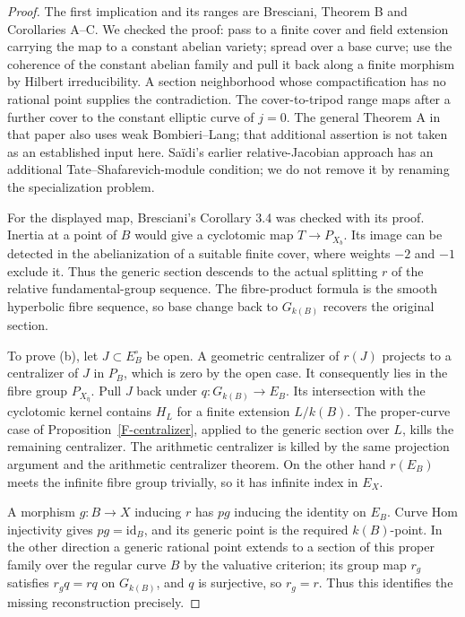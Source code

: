 \begin{proof}
The first implication and its ranges are Bresciani, Theorem B
and Corollaries A--C\cite{F-BrescianiFiniteType}. We checked
the proof: pass to a finite cover and field extension carrying
the map to a constant abelian variety; spread over a base
curve; use the coherence of the constant abelian family and
pull it back along a finite morphism by Hilbert irreducibility.
A section neighborhood whose compactification has no rational
point supplies the contradiction. The cover-to-tripod range
maps after a further cover to the constant elliptic curve of
$j=0$. The general Theorem A in that paper also uses weak
Bombieri--Lang; that additional assertion is not taken as an
established input here. Sa\"idi's earlier relative-Jacobian
approach has an additional Tate--Shafarevich-module condition;
we do not remove it by renaming the specialization problem.

For the displayed map, Bresciani's Corollary 3.4 was checked
with its proof. Inertia at a point of $B$ would give a
cyclotomic map $T\to P_{X_b}$. Its image can be detected in
the abelianization of a suitable finite cover, where weights
$-2$ and $-1$ exclude it. Thus the generic section descends
to the actual splitting $r$ of the relative fundamental-group
sequence. The fibre-product formula is the smooth hyperbolic
fibre sequence, so base change back to $G_{k(B)}$ recovers the
original section.

To prove (b), let $J\subset E_B^\circ$ be open. A geometric
centralizer of $r(J)$ projects to a centralizer of $J$ in
$P_B$, which is zero by the open case. It consequently lies
in the fibre group $P_{X_{\overline\eta}}$. Pull $J$ back
under $q:G_{k(B)}\to E_B$. Its intersection with the
cyclotomic kernel contains $H_L$ for a finite extension
$L/k(B)$. The proper-curve case of
Proposition~\ref{F-centralizer}, applied to the generic
section over $L$, kills the remaining centralizer. The
arithmetic centralizer is killed by the same projection
argument and the arithmetic centralizer theorem. On the
other hand $r(E_B)$ meets the infinite fibre group trivially,
so it has infinite index in $E_X$.

A morphism $g:B\to X$ inducing $r$ has $p g$ inducing the
identity on $E_B$. Curve Hom injectivity gives $p g=\mathrm{id}_B$,
and its generic point is the required $k(B)$-point. In the
other direction a generic rational point extends to a section
of this proper family over the regular curve $B$ by the
valuative criterion; its group map $r_g$ satisfies $r_gq=rq$ on $G_{k(B)}$,
and $q$ is surjective, so $r_g=r$. Thus this identifies
the missing reconstruction precisely.


\end{proof}
